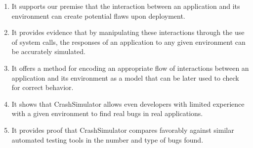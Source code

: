 \begin{enumerate}

\item{It supports our premise that the interaction between an application
and its environment can create potential flaws upon deployment.}

\item{It provides evidence that by manipulating these interactions through
the use of system calls, the responses of an application to any given
environment can be accurately simulated.}

\item{It offers a method for encoding an appropriate flow of
interactions between an application and its environment as a model that
can be later used to check for correct behavior.}

\item{It shows that CrashSimulator allows even developers with limited
experience with a given environment to find real bugs in
real applications.}

\item{It provides proof that CrashSimulator compares favorably against
similar automated testing tools in the number and type of bugs found.}

\end{enumerate}
